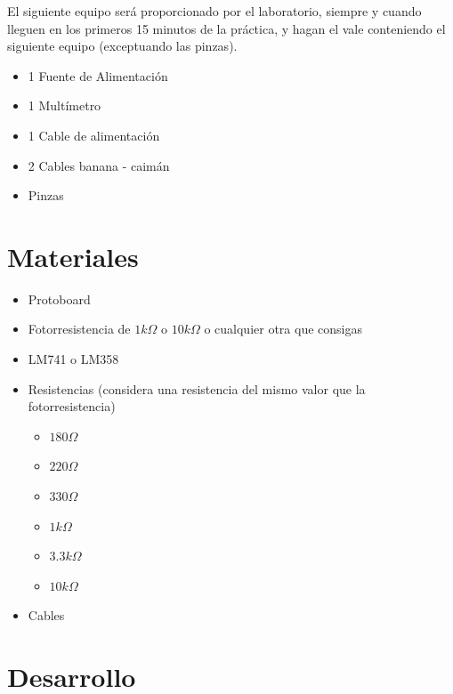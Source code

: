 	El siguiente equipo será proporcionado por el laboratorio, siempre y cuando lleguen en los primeros 15 minutos de la práctica, y hagan el vale conteniendo el siguiente equipo (exceptuando las pinzas).

	\begin{itemize}
		\item 1 Fuente de Alimentación
		\item 1 Multímetro
		\item 1 Cable de alimentación
		\item 2 Cables banana - caimán
		\item Pinzas
	\end{itemize}


\section{Materiales}

	\begin{itemize}
		\item Protoboard
		\item Fotorresistencia de $1k \Omega$ o $10 k \Omega$ o cualquier otra que consigas
		\item LM741 o LM358
		\item Resistencias (considera una resistencia del mismo valor que la fotorresistencia)
		\begin{itemize}
			\item $180 \Omega$
			\item $220 \Omega$
			\item $330 \Omega$
			\item $1 k\Omega$
			\item $3.3 k\Omega$
			\item $10 k\Omega$
		\end{itemize}
		\item Cables
	\end{itemize}


\section{Desarrollo}
	

